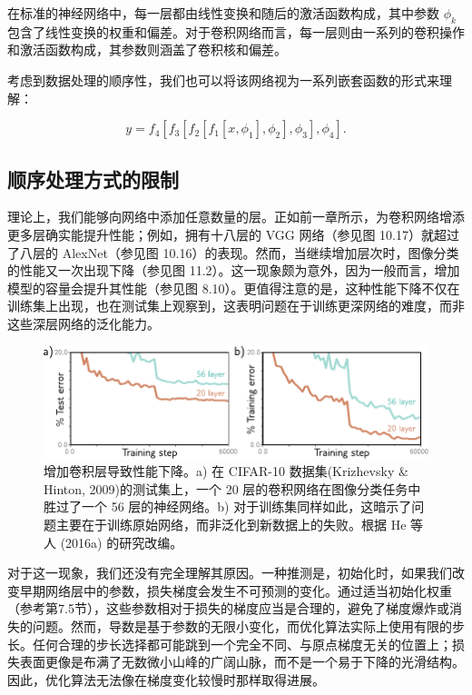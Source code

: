 \documentclass[lang=cn,newtx,10pt,scheme=chinese]{elegantbook}
\begin{document}
在标准的神经网络中，每一层都由线性变换和随后的激活函数构成，其中参数 \(\phi_k\) 包含了线性变换的权重和偏差。对于卷积网络而言，每一层则由一系列的卷积操作和激活函数构成，其参数则涵盖了卷积核和偏差。

考虑到数据处理的顺序性，我们也可以将该网络视为一系列嵌套函数的形式来理解：

\begin{equation}
y = f_4 \left[ f_3 \left[ f_2 \left[ f_1[x, \phi_1], \phi_2 \right], \phi_3 \right], \phi_4 \right]. 
\end{equation}
\subsection{顺序处理方式的限制}
理论上，我们能够向网络中添加任意数量的层。正如前一章所示，为卷积网络增添更多层确实能提升性能；例如，拥有十八层的 VGG 网络（参见图 10.17）就超过了八层的 AlexNet（参见图 10.16）的表现。然而，当继续增加层次时，图像分类的性能又一次出现下降（参见图 11.2）。这一现象颇为意外，因为一般而言，增加模型的容量会提升其性能（参见图 8.10）。更值得注意的是，这种性能下降不仅在训练集上出现，也在测试集上观察到，这表明问题在于训练更深网络的难度，而非这些深层网络的泛化能力。

\begin{figure}[ht!]
\centering
\includegraphics[width=0.7\linewidth]{PDFFigures/UDLChap11PDF/ResidualMotivation.pdf}
\caption{增加卷积层导致性能下降。a) 在 CIFAR-10 数据集(Krizhevsky \& Hinton, 2009)的测试集上，一个 20 层的卷积网络在图像分类任务中胜过了一个 56 层的神经网络。b) 对于训练集同样如此，这暗示了问题主要在于训练原始网络，而非泛化到新数据上的失败。根据 He 等人 (2016a) 的研究改编。}
\end{figure}


对于这一现象，我们还没有完全理解其原因。一种推测是，初始化时，如果我们改变早期网络层中的参数，损失梯度会发生不可预测的变化。通过适当初始化权重（参考第7.5节），这些参数相对于损失的梯度应当是合理的，避免了梯度爆炸或消失的问题。然而，导数是基于参数的无限小变化，而优化算法实际上使用有限的步长。任何合理的步长选择都可能跳到一个完全不同、与原点梯度无关的位置上；损失表面更像是布满了无数微小山峰的广阔山脉，而不是一个易于下降的光滑结构。因此，优化算法无法像在梯度变化较慢时那样取得进展。
\end{document}
